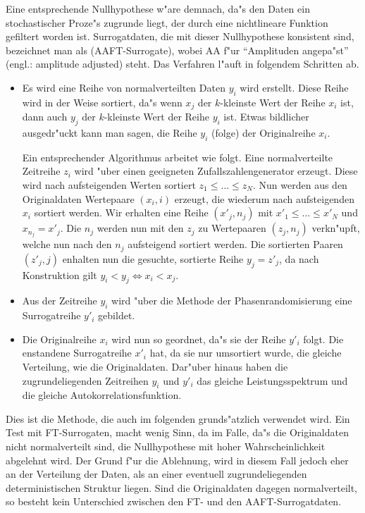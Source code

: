 Eine entsprechende Nullhypothese w"are demnach, da"s den Daten ein stochastischer Proze"s
zugrunde liegt, der durch eine nichtlineare Funktion gefiltert worden ist. Surrogatdaten, die
mit dieser Nullhypothese konsistent sind, bezeichnet man als \begriff(AAFT-Surrogate),
wobei AA f"ur ``Amplituden angepa"st'' (engl.: amplitude adjusted) steht.  
Das Verfahren l"auft in  folgendem Schritten ab.
\begin{itemize}
\item Es wird eine Reihe von normalverteilten Daten $y_i$ wird erstellt. Diese Reihe wird
  in der Weise  sortiert, da"s wenn $x_j$ der $k$-kleinste Wert der Reihe $x_i$ ist, dann
  auch $y_j$ der $k$-kleinste Wert der Reihe $y_i$ ist. Etwas bildlicher ausgedr"uckt
  kann man sagen, die Reihe $y_i$ \naja(folge) der Originalreihe $x_i$.
  
  Ein entsprechender Algorithmus arbeitet wie folgt.  Eine normalverteilte Zeitreihe $z_i$
  wird "uber einen geeigneten Zufallszahlengenerator erzeugt. Diese wird nach
  aufsteigenden Werten sortiert $z_1\leq\dots\leq z_N$.  Nun werden aus den Originaldaten
  Wertepaare $(x_i,i)$ erzeugt, die wiederum nach aufsteigenden $x_i$ sortiert werden. Wir
  erhalten eine Reihe $(x'_j,n_j)$ mit $x'_1\leq\dots\leq x'_N$ und $x_{n_j}=x'_j$. Die
  $n_j$ werden nun mit den $z_j$ zu Wertepaaren $(z_j,n_j)$ verkn"upft, welche nun nach
  den $n_j$ aufsteigend sortiert werden. Die sortierten Paaren $(z'_j,j)$ enhalten nun die
  gesuchte, sortierte Reihe $y_j=z'_j$, da nach Konstruktion gilt $y_i<y_j\Leftrightarrow
  x_i<x_j$.
\item Aus der Zeitreihe $y_i$ wird "uber die Methode der Phasenrandomisierung eine
  Surrogatreihe $y'_i$ gebildet. 
\item Die Originalreihe $x_i$ wird nun so geordnet, da"s sie der Reihe $y'_i$ folgt. Die
  enstandene Surrogatreihe $x'_i$ hat, da sie nur umsortiert wurde, die gleiche
  Verteilung, wie die Originaldaten. Dar"uber hinaus haben die zugrundeliegenden
  Zeitreihen $y_i$ und $y'_i$ das gleiche Leistungsspektrum und die gleiche Autokorrelationsfunktion.
\end{itemize}
Dies ist die Methode, die auch im folgenden grunds"atzlich verwendet wird. Ein Test mit
FT-Surrogaten, macht wenig Sinn, da im Falle, da"s die Originaldaten nicht normalverteilt
sind, die Nullhypothese mit hoher Wahrscheinlichkeit abgelehnt wird. Der Grund f"ur die
Ablehnung, wird in diesem Fall jedoch eher an der Verteilung der Daten, als an einer 
eventuell zugrundeliegenden deterministischen Struktur liegen. Sind die Originaldaten dagegen
normalverteilt, so besteht kein Unterschied zwischen den FT- und den AAFT-Surrogatdaten.


